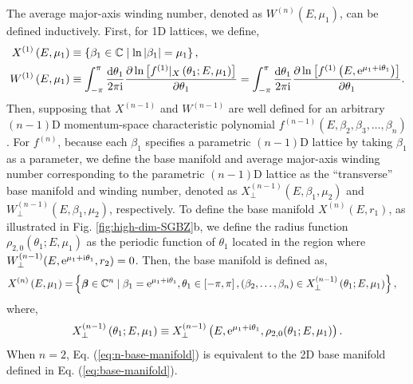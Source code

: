 \documentclass[pdflatex,sn-nature, iicol]{sn-jnl}%
\theoremstyle{thmstyleone}%
\theoremstyle{thmstyletwo}%
\theoremstyle{thmstylethree}%
\begin{document}
The average major-axis winding number, denoted as $W^{(n)}(E,\mu_{1})$, can be
defined inductively. First, for 1D lattices, we define, 
\begin{align}
X^{(1)}\left(E,\mu_{1}\right) & \equiv\left\{ \beta_{1}\in\mathbb{C}\mid\ln\left|\beta_{1}\right|=\mu_{1}\right\} ,\\
W^{(1)}\left(E,\mu_{1}\right) & \equiv\int_{-\pi}^{\pi}\frac{\mathrm{d}\theta_{1}}{2\pi\mathrm{i}}\frac{\partial\ln\left[f^{(1)}|_{X}\left(\theta_{1};E,\mu_{1}\right)\right]}{\partial\theta_{1}}=\int_{-\pi}^{\pi}\frac{\mathrm{d}\theta_{1}}{2\pi\mathrm{i}}\frac{\partial\ln\left[f^{(1)}\left(E,\mathrm{e}^{\mu_{1}+\mathrm{i}\theta_{1}}\right)\right]}{\partial\theta_{1}}.
\end{align}
Then, supposing that $X^{(n-1)}$ and $W^{(n-1)}$ are well defined for an arbitrary $(n-1)$D momentum-space
characteristic polynomial $f^{(n-1)}(E,\beta_{2},\beta_{3},\dots,\beta_{n})$.
For $f^{(n)}$, because each $\beta_{1}$ specifies a parametric $(n-1)$D
lattice by taking $\beta_{1}$ as a parameter, we define the base
manifold and average major-axis winding number corresponding to the parametric
$(n-1)$D lattice as the ``transverse'' base manifold and
winding number, denoted as $X_{\perp}^{(n-1)}(E,\beta_{1},\mu_{2})$
and $W_{\perp}^{(n-1)}(E,\beta_{1},\mu_{2})$, respectively. To define
the base manifold $X^{(n)}(E,r_{1})$, as illustrated in Fig. \ref{fig:high-dim-SGBZ}b,
we define the radius function $\rho_{2,0}(\theta_{1};E,\mu_{1})$ as
the periodic function of $\theta_{1}$ located in the region where
$W_{\perp}^{(n-1)}(E,\mathrm{e}^{\mu_{1}+\mathrm{i}\theta_{1}},r_{2})=0$. Then,
the base manifold is defined as, 
\begin{align}
X^{(n)}\left(E,\mu_{1}\right)= & \left\{ \boldsymbol{\beta}\in\mathbb{C}^{n}\mid\beta_{1}=\mathrm{e}^{\mu_{1}+\mathrm{i}\theta_{1}},\theta_{1}\in\left[-\pi,\pi\right],(\beta_{2},\dots,\beta_{n})\in X_{\perp}^{(n-1)}\left(\theta_{1};E,\mu_{1}\right)\right\} ,\label{eq:n-base-manifold}
\end{align}
where, 
\begin{equation}
X_{\perp}^{(n-1)}\left(\theta_{1};E,\mu_{1}\right)\equiv X_{\perp}^{(n-1)}\left(E,\mathrm{e}^{\mu_{1}+\mathrm{i}\theta_{1}},\rho_{2,0}(\theta_{1};E,\mu_{1})\right).
\end{equation}
When $n=2$, Eq. (\ref{eq:n-base-manifold}) is equivalent to the
2D base manifold defined in Eq. (\ref{eq:base-manifold}).
\end{document}
